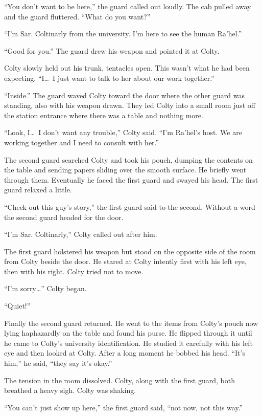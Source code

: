 ``You don't want to be here,'' the guard called out loudly. The cab pulled away and the guard
fluttered. ``What do you want?''

``I'm Sar. Coltinarly from the university. I'm here to see the human Ra'hel.''

``Good for you.'' The guard drew his weapon and pointed it at Colty.

Colty slowly held out his trunk, tentacles open. This wasn't what he had been expecting.
``I\ldots\ I just want to talk to her about our work together.''

``Inside.'' The guard waved Colty toward the door where the other guard was standing, also with
his weapon drawn. They led Colty into a small room just off the station entrance where there was
a table and nothing more.

``Look, I\ldots\ I don't want any trouble,'' Colty said. ``I'm Ra'hel's host. We are working
together and I need to consult with her.''

The second guard searched Colty and took his pouch, dumping the contents on the table and
sending papers sliding over the smooth surface. He briefly went through them. Eventually he
faced the first guard and swayed his head. The first guard relaxed a little.

``Check out this guy's story,'' the first guard said to the second. Without a word the second
guard headed for the door.

``I'm Sar. Coltinarly,'' Colty called out after him.

The first guard holstered his weapon but stood on the opposite side of the room from Colty
beside the door. He stared at Colty intently first with his left eye, then with his right. Colty
tried not to move.

``I'm sorry\ldots'' Colty began.

``Quiet!''

Finally the second guard returned. He went to the items from Colty's pouch now lying haphazardly
on the table and found his purse. He flipped through it until he came to Colty's university
identification. He studied it carefully with his left eye and then looked at Colty. After a long
moment he bobbed his head. ``It's him,'' he said, ``they say it's okay.''

The tension in the room dissolved. Colty, along with the first guard, both breathed a heavy
sigh. Colty was shaking.

``You can't just show up here,'' the first guard said, ``not now, not this way.''

